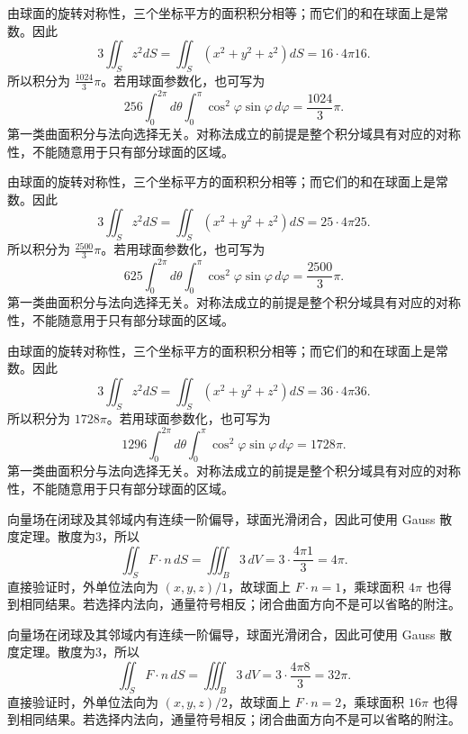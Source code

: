 \documentclass[12pt,fontset=fandol]{ctexart}
\begin{document}
\begin{solve}\label{ans:c43q10}
由球面的旋转对称性，三个坐标平方的面积积分相等；而它们的和在球面上是常数。因此
\[
3\iint_Sz^2dS=\iint_S(x^2+y^2+z^2)dS=16\cdot4\pi16.
\]
所以积分为 $\frac{1024}{3}\pi$。若用球面参数化，也可写为
\[
256\int_0^{2\pi}d\theta\int_0^\pi\cos^2\varphi\sin\varphi\,d\varphi=\frac{1024}{3}\pi.
\]
第一类曲面积分与法向选择无关。对称法成立的前提是整个积分域具有对应的对称性，不能随意用于只有部分球面的区域。
\end{solve}

\begin{solve}\label{ans:c43q11}
由球面的旋转对称性，三个坐标平方的面积积分相等；而它们的和在球面上是常数。因此
\[
3\iint_Sz^2dS=\iint_S(x^2+y^2+z^2)dS=25\cdot4\pi25.
\]
所以积分为 $\frac{2500}{3}\pi$。若用球面参数化，也可写为
\[
625\int_0^{2\pi}d\theta\int_0^\pi\cos^2\varphi\sin\varphi\,d\varphi=\frac{2500}{3}\pi.
\]
第一类曲面积分与法向选择无关。对称法成立的前提是整个积分域具有对应的对称性，不能随意用于只有部分球面的区域。
\end{solve}

\begin{solve}\label{ans:c43q12}
由球面的旋转对称性，三个坐标平方的面积积分相等；而它们的和在球面上是常数。因此
\[
3\iint_Sz^2dS=\iint_S(x^2+y^2+z^2)dS=36\cdot4\pi36.
\]
所以积分为 $1728\pi$。若用球面参数化，也可写为
\[
1296\int_0^{2\pi}d\theta\int_0^\pi\cos^2\varphi\sin\varphi\,d\varphi=1728\pi.
\]
第一类曲面积分与法向选择无关。对称法成立的前提是整个积分域具有对应的对称性，不能随意用于只有部分球面的区域。
\end{solve}

\begin{solve}\label{ans:c43q13}
向量场在闭球及其邻域内有连续一阶偏导，球面光滑闭合，因此可使用 Gauss 散度定理。散度为3，所以
\[
\iint_SF\cdot n\,dS=\iiint_B3\,dV=3\cdot\frac{4\pi1}3=4\pi.
\]
直接验证时，外单位法向为 $(x,y,z)/1$，故球面上 $F\cdot n=1$，乘球面积 $4\pi$ 也得到相同结果。若选择内法向，通量符号相反；闭合曲面方向不是可以省略的附注。
\end{solve}

\begin{solve}\label{ans:c43q14}
向量场在闭球及其邻域内有连续一阶偏导，球面光滑闭合，因此可使用 Gauss 散度定理。散度为3，所以
\[
\iint_SF\cdot n\,dS=\iiint_B3\,dV=3\cdot\frac{4\pi8}3=32\pi.
\]
直接验证时，外单位法向为 $(x,y,z)/2$，故球面上 $F\cdot n=2$，乘球面积 $16\pi$ 也得到相同结果。若选择内法向，通量符号相反；闭合曲面方向不是可以省略的附注。
\end{solve}
\end{document}
